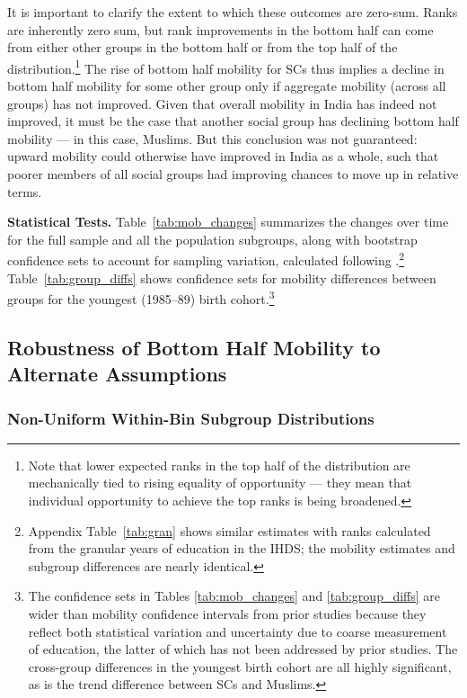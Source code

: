 \documentclass[12pt,letterpaper]{article}
\numberwithin{equation}{section}
\begin{document}
It is important to clarify the extent to which these outcomes are zero-sum. Ranks are inherently zero sum, but rank improvements in the bottom half can come from either other groups in the bottom half or from the top half of the distribution.\footnote{Note that lower expected ranks in the top half of the distribution are mechanically tied to rising equality of opportunity --- they mean that individual opportunity to achieve the top ranks is being broadened.} The rise of bottom half mobility for SCs thus implies a decline in bottom half mobility for some other group only if aggregate mobility (across all groups) has not improved. Given that overall mobility in India has indeed not improved, it must be the case that another social group has declining bottom half mobility --- in this case, Muslims. But this conclusion was not guaranteed: upward mobility could otherwise have improved in India as a whole, such that poorer members of all social groups had improving chances to move up in relative terms.

\textbf{Statistical Tests.} Table~\ref{tab:mob_changes} summarizes the changes over time for the full sample and all the population subgroups, along with bootstrap confidence sets to account for sampling variation, calculated following .\footnote{Appendix Table~\ref{tab:gran} shows similar estimates with ranks calculated from the granular years of education in the IHDS; the mobility estimates and subgroup differences are nearly identical.} Table~\ref{tab:group_diffs} shows confidence sets for mobility differences between groups for the youngest (1985--89) birth cohort.\footnote{The confidence sets in Tables \ref{tab:mob_changes} and \ref{tab:group_diffs} are wider than mobility confidence intervals from prior studies because they reflect both statistical variation and uncertainty due to coarse measurement of education, the latter of which has not been addressed by prior studies. The cross-group differences in the youngest birth cohort are all highly significant, as is the trend difference between SCs and Muslims.}

\subsection{Robustness of Bottom Half Mobility to Alternate Assumptions}
\label{sec:rob} 

\subsubsection{Non-Uniform Within-Bin Subgroup Distributions}
\label{sec:within_bin}
\end{document}
